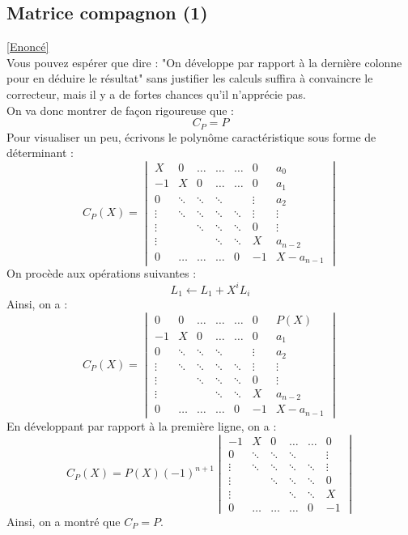 \documentclass[8pt]{book}
\begin{document}
	\subsection{Matrice compagnon (1)}
	\label{Matrice compagnon (1) corrigé}
	\textcolor{blue}{\hyperref[Matrice compagnon (1)]{[Enoncé]}}\\
	Vous pouvez espérer que dire : "On développe par rapport à la dernière colonne pour en déduire le résultat" sans justifier les calculs suffira à convaincre le correcteur, mais il y a de fortes chances qu'il n'apprécie pas.\\ On va donc montrer de façon rigoureuse que : \[C_P=P\]
	Pour visualiser un peu, écrivons le polynôme caractéristique sous forme de déterminant : 
	\[C_P(X)=\begin{vmatrix}
		X&0&\dots&\dots& \dots&0&a_0\\
		-1&X&0 &\dots&\dots &0&a_1\\
		0&\ddots&\ddots&\ddots&&\vdots&a_2\\
		\vdots&\ddots&\ddots&\ddots&\ddots&\vdots&\vdots\\
		\vdots&&\ddots&\ddots&\ddots&0&\vdots\\
		\vdots&&&\ddots&\ddots&X&a_{n-2}\\
		0&\dots&\dots&\dots&0&-1&X-a_{n-1}
	\end{vmatrix}\]
	On procède aux opérations suivantes  : \[L_1\leftarrow L_1+X^iL_i\]
	Ainsi, on a : \[C_P(X)=\begin{vmatrix}
		0&0&\dots&\dots& \dots&0&P(X)\\
		-1&X&0 &\dots&\dots &0&a_1\\
		0&\ddots&\ddots&\ddots&&\vdots&a_2\\
		\vdots&\ddots&\ddots&\ddots&\ddots&\vdots&\vdots\\
		\vdots&&\ddots&\ddots&\ddots&0&\vdots\\
		\vdots&&&\ddots&\ddots&X&a_{n-2}\\
		0&\dots&\dots&\dots&0&-1&X-a_{n-1}
	\end{vmatrix}\]
	En développant par rapport à la première ligne, on a : 
	\[C_P(X)=P(X)(-1)^{n+1}\begin{vmatrix}
		-1&X&0 &\dots&\dots &0\\
		0&\ddots&\ddots&\ddots&&\vdots\\
		\vdots&\ddots&\ddots&\ddots&\ddots&\vdots\\
		\vdots&&\ddots&\ddots&\ddots&0\\
		\vdots&&&\ddots&\ddots&X\\
		0&\dots&\dots&\dots&0&-1
	\end{vmatrix}\]
	Ainsi, on a montré que $C_P=P$.
	
\end{document}
